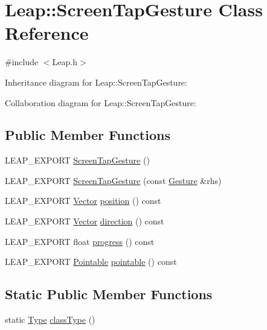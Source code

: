 \hypertarget{class_leap_1_1_screen_tap_gesture}{}\section{Leap\+:\+:Screen\+Tap\+Gesture Class Reference}
\label{class_leap_1_1_screen_tap_gesture}


{\ttfamily \#include $<$Leap.\+h$>$}



Inheritance diagram for Leap\+:\+:Screen\+Tap\+Gesture\+:


Collaboration diagram for Leap\+:\+:Screen\+Tap\+Gesture\+:
\subsection*{Public Member Functions}
\begin{DoxyCompactItemize}
\item 
L\+E\+A\+P\+\_\+\+E\+X\+P\+O\+RT \hyperlink{class_leap_1_1_screen_tap_gesture_a9c58b16806da33ae61a090f16eb0f750}{Screen\+Tap\+Gesture} ()
\item 
L\+E\+A\+P\+\_\+\+E\+X\+P\+O\+RT \hyperlink{class_leap_1_1_screen_tap_gesture_a1f433e04b2e6adb7a95811c496397ab6}{Screen\+Tap\+Gesture} (const \hyperlink{class_leap_1_1_gesture}{Gesture} \&rhs)
\item 
L\+E\+A\+P\+\_\+\+E\+X\+P\+O\+RT \hyperlink{struct_leap_1_1_vector}{Vector} \hyperlink{class_leap_1_1_screen_tap_gesture_ab7f24af710fee9bd8111a9feaed76894}{position} () const
\item 
L\+E\+A\+P\+\_\+\+E\+X\+P\+O\+RT \hyperlink{struct_leap_1_1_vector}{Vector} \hyperlink{class_leap_1_1_screen_tap_gesture_a50f50d4826e337931b7a904768089ae0}{direction} () const
\item 
L\+E\+A\+P\+\_\+\+E\+X\+P\+O\+RT float \hyperlink{class_leap_1_1_screen_tap_gesture_a3c5dd0ca7c5d5c9e35ae6234a727ca88}{progress} () const
\item 
L\+E\+A\+P\+\_\+\+E\+X\+P\+O\+RT \hyperlink{class_leap_1_1_pointable}{Pointable} \hyperlink{class_leap_1_1_screen_tap_gesture_aaf74677fee3ed0d55f612152dae53c30}{pointable} () const
\end{DoxyCompactItemize}
\subsection*{Static Public Member Functions}
\begin{DoxyCompactItemize}
\item 
static \hyperlink{class_leap_1_1_gesture_a6fa6dd4f28c502f0d55abc6b71c6f9b1}{Type} \hyperlink{class_leap_1_1_screen_tap_gesture_ae967e0ad37fc48faa25044b4a9977f25}{class\+Type} ()
\end{DoxyCompactItemize}
